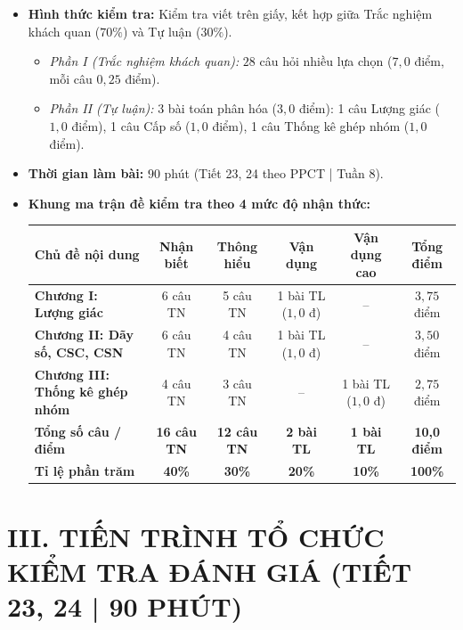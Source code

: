\documentclass[12pt, a4paper]{article}
\begin{document}
\begin{itemize}[leftmargin=1.2cm]
    \item \textbf{Hình thức kiểm tra:} Kiểm tra viết trên giấy, kết hợp giữa Trắc nghiệm khách quan ($70\%$) và Tự luận ($30\%$).
    \begin{itemize}[leftmargin=0.6cm]
        \item \textit{Phần I (Trắc nghiệm khách quan):} $28$ câu hỏi nhiều lựa chọn ($7{,}0$ điểm, mỗi câu $0{,}25$ điểm).
        \item \textit{Phần II (Tự luận):} $3$ bài toán phân hóa ($3{,}0$ điểm): 1 câu Lượng giác ($1{,}0$ điểm), 1 câu Cấp số ($1{,}0$ điểm), 1 câu Thống kê ghép nhóm ($1{,}0$ điểm).
    \end{itemize}
    \item \textbf{Thời gian làm bài:} $90$ phút (Tiết 23, 24 theo PPCT | Tuần 8).
    \item \textbf{Khung ma trận đề kiểm tra theo 4 mức độ nhận thức:}
    \begin{center}
    \small
    \begin{tabularx}{\textwidth}{|X|c|c|c|c|c|}
    \hline
    \textbf{Chủ đề nội dung} & \textbf{Nhận biết} & \textbf{Thông hiểu} & \textbf{Vận dụng} & \textbf{Vận dụng cao} & \textbf{Tổng điểm} \\ \hline
    \textbf{Chương I: Lượng giác} & 6 câu TN & 5 câu TN & 1 bài TL ($1{,}0$ đ) & -- & $3{,}75$ điểm \\ \hline
    \textbf{Chương II: Dãy số, CSC, CSN} & 6 câu TN & 4 câu TN & 1 bài TL ($1{,}0$ đ) & -- & $3{,}50$ điểm \\ \hline
    \textbf{Chương III: Thống kê ghép nhóm} & 4 câu TN & 3 câu TN & -- & 1 bài TL ($1{,}0$ đ) & $2{,}75$ điểm \\ \hline
    \textbf{Tổng số câu / điểm} & \textbf{16 câu TN} & \textbf{12 câu TN} & \textbf{2 bài TL} & \textbf{1 bài TL} & \textbf{10,0 điểm} \\ \hline
    \textbf{Tỉ lệ phần trăm} & \textbf{40\%} & \textbf{30\%} & \textbf{20\%} & \textbf{10\%} & \textbf{100\%} \\ \hline
    \end{tabularx}
    \end{center}
\end{itemize}

\section*{III. TIẾN TRÌNH TỔ CHỨC KIỂM TRA ĐÁNH GIÁ (TIẾT 23, 24 | 90 PHÚT)}
\end{document}
